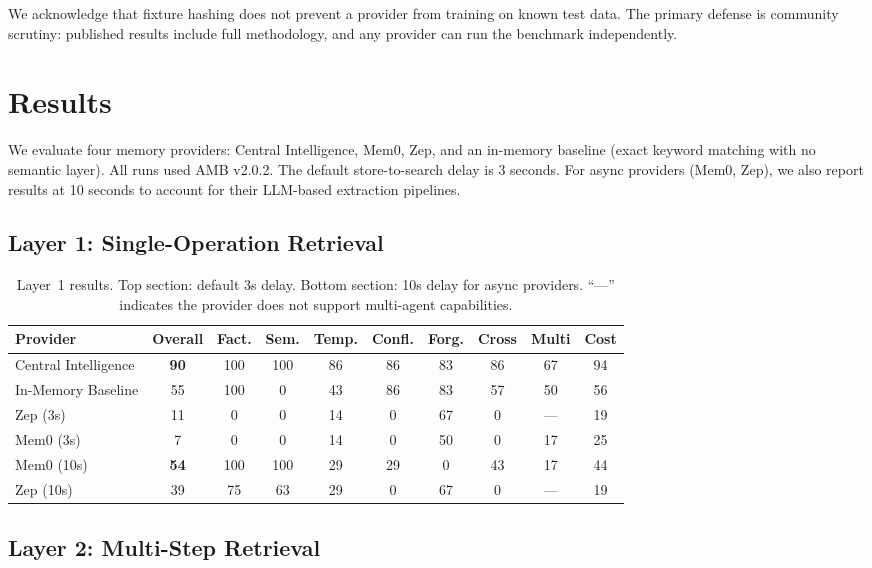 \documentclass[11pt]{article}
\begin{document}
We acknowledge that fixture hashing does not prevent a provider from training on known test data. The primary defense is community scrutiny: published results include full methodology, and any provider can run the benchmark independently.

\section{Results}

We evaluate four memory providers: Central Intelligence, Mem0, Zep, and an in-memory baseline (exact keyword matching with no semantic layer). All runs used AMB v2.0.2. The default store-to-search delay is 3 seconds. For async providers (Mem0, Zep), we also report results at 10 seconds to account for their LLM-based extraction pipelines.

\subsection{Layer 1: Single-Operation Retrieval}

\begin{table}[h]
\centering
\small
\begin{tabular}{lccccccccc}
\toprule
\textbf{Provider} & \textbf{Overall} & \textbf{Fact.} & \textbf{Sem.} & \textbf{Temp.} & \textbf{Confl.} & \textbf{Forg.} & \textbf{Cross} & \textbf{Multi} & \textbf{Cost} \\
\midrule
Central Intelligence & \textbf{90} & 100 & 100 & 86 & 86 & 83 & 86 & 67 & 94 \\
In-Memory Baseline & 55 & 100 & 0 & 43 & 86 & 83 & 57 & 50 & 56 \\
Zep (3s) & 11 & 0 & 0 & 14 & 0 & 67 & 0 & --- & 19 \\
Mem0 (3s) & 7 & 0 & 0 & 14 & 0 & 50 & 0 & 17 & 25 \\
\midrule
Mem0 (10s) & \textbf{54} & 100 & 100 & 29 & 29 & 0 & 43 & 17 & 44 \\
Zep (10s) & 39 & 75 & 63 & 29 & 0 & 67 & 0 & --- & 19 \\
\bottomrule
\end{tabular}
\caption{Layer~1 results. Top section: default 3s delay. Bottom section: 10s delay for async providers. ``---'' indicates the provider does not support multi-agent capabilities.}
\label{tab:layer1}
\end{table}

\subsection{Layer 2: Multi-Step Retrieval}
\end{document}
